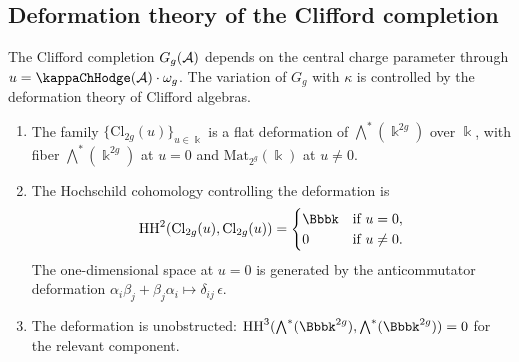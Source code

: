 \subsection{Deformation theory of the Clifford completion}

The Clifford completion $G_g(\mathcal{A})$ depends on the central charge
parameter through $u = \kappaChHodge(\cA) \cdot \omega_g$. The variation of
$G_g$ with $\kappa$ is controlled by the deformation theory of
Clifford algebras.

\begin{proposition}
\begin{enumerate}[label=\textup{(\roman*)}]
\item The family $\{\mathrm{Cl}_{2g}(u)\}_{u \in \Bbbk}$ is a flat
deformation of $\bigwedge^*(\Bbbk^{2g})$ over $\Bbbk$, with fiber
$\bigwedge^*(\Bbbk^{2g})$ at $u = 0$ and
$\mathrm{Mat}_{2^g}(\Bbbk)$ at $u \neq 0$.

\item The Hochschild cohomology controlling the deformation is
\begin{equation}%
\HH^2(\mathrm{Cl}_{2g}(u), \mathrm{Cl}_{2g}(u))
=
\begin{cases}
\Bbbk & \text{if } u = 0, \\
0 & \text{if } u \neq 0.
\end{cases}
\end{equation}
The one-dimensional space at $u = 0$ is generated by the
anticommutator deformation $\alpha_i\beta_j + \beta_j\alpha_i
\mapsto \delta_{ij}\,\epsilon$.

\item The deformation is unobstructed: $\HH^3(\bigwedge^*(\Bbbk^{2g}),
\bigwedge^*(\Bbbk^{2g})) = 0$ for the relevant component.
\end{enumerate}
\end{proposition}

